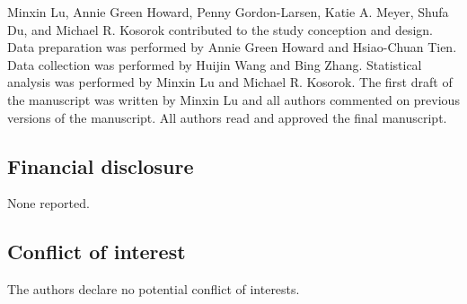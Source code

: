 \documentclass{article}
\begin{document}
Minxin Lu, Annie Green Howard, Penny Gordon-Larsen, Katie A. Meyer, Shufa Du, and Michael R. Kosorok contributed to the study conception and design. Data preparation was performed by Annie Green Howard and Hsiao-Chuan Tien. Data collection was performed by Huijin Wang and Bing Zhang. Statistical analysis was performed by Minxin Lu and Michael R. Kosorok. The first draft of the manuscript was written by Minxin Lu and all authors commented on previous versions of the manuscript. All authors read and approved the final manuscript.

\subsection*{Financial disclosure}

None reported.

\subsection*{Conflict of interest}

The authors declare no potential conflict of interests.

\clearpage






\end{document}
